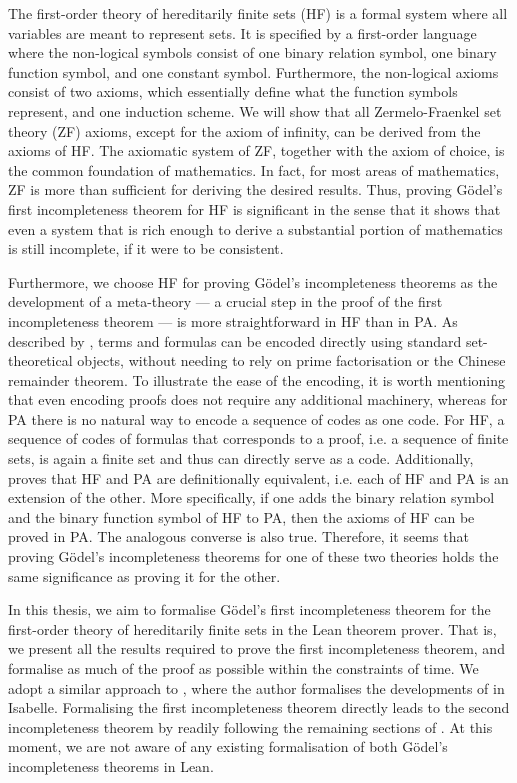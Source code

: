 The first-order theory of hereditarily finite sets (HF) is a formal system where all variables are 
meant to represent sets. It is specified by a first-order language where the non-logical symbols
consist of one binary relation symbol, one binary function symbol, and one constant symbol.
Furthermore, the non-logical axioms consist of two axioms, which essentially define what the 
function symbols represent, and one induction scheme.
We will show that all Zermelo-Fraenkel set theory (ZF) axioms, except for the axiom of infinity,
can be derived from the axioms of HF.
The axiomatic system of ZF, together with the axiom of choice, 
is the common foundation of mathematics.
In fact, for most areas of mathematics, ZF is more than sufficient for deriving the desired results.
Thus, proving Gödel's first incompleteness theorem for HF is significant in the sense that
it shows that even a system that is rich enough to derive a substantial portion of mathematics 
is still incomplete, if it were to be consistent.

Furthermore, we choose HF for proving Gödel's incompleteness theorems as 
the development of a meta-theory — a crucial step in the proof of the 
first incompleteness theorem — is more straightforward in HF than in PA.
As described by \cite{swierczkowski2003finite}, terms and formulas can be encoded directly 
using standard set-theoretical objects, without needing to rely on prime factorisation or 
the Chinese remainder theorem.
To illustrate the ease of the encoding, it is worth mentioning that 
even encoding proofs does not require any additional machinery, whereas for PA there is no natural
way to encode a sequence of codes as one code.
For HF, a sequence of codes of formulas that corresponds to a proof, 
i.e. a sequence of finite sets, is again a finite set and thus can directly serve as a code.
Additionally, \cite{swierczkowski2003finite} proves that HF and PA are definitionally equivalent,
i.e. each of HF and PA is an extension of the other. More specifically,
if one adds the binary relation symbol and the binary function symbol of HF to PA, 
then the axioms of HF can be proved in PA. The analogous converse is also true.
Therefore, it seems that proving Gödel's incompleteness theorems for one of these two theories 
holds the same significance as proving it for the other.

In this thesis, we aim to formalise Gödel's first incompleteness theorem for the first-order theory of
hereditarily finite sets in the Lean theorem prover. 
That is, we present all the results required to prove the first
incompleteness theorem, and formalise as much of the proof as possible within the constraints of 
time. We adopt a similar approach to \cite{paulson2014machine}, where the author formalises the 
developments of \cite{swierczkowski2003finite} in Isabelle.
Formalising the first incompleteness theorem directly leads to the second incompleteness theorem
by readily following the remaining sections of \cite{swierczkowski2003finite}.
At this moment, we are not aware of any existing formalisation of both Gödel's incompleteness 
theorems in Lean.

